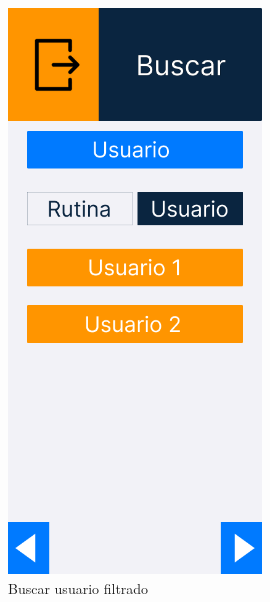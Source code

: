 \begin{figure}[H]
   \centering
    \includegraphics[width=0.6\textwidth]{fotos/Frame 54.png}
    \caption{Buscar usuario filtrado}
    \label{fig:Buscar usuario filtrado}
\end{figure}
